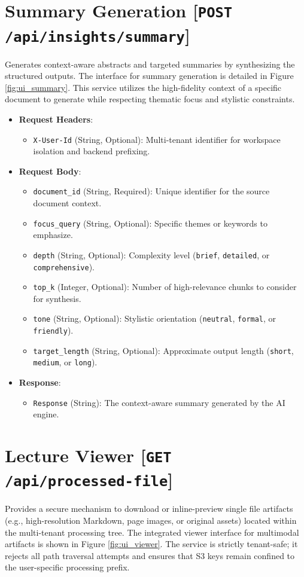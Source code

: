 \section*{Summary Generation [\texttt{POST} \texttt{/api/insights/summary}]}
Generates context-aware abstracts and targeted summaries by synthesizing the structured outputs. The interface for summary generation is detailed in Figure \ref{fig:ui_summary}. This service utilizes the high-fidelity context of a specific document to generate while respecting thematic focus and stylistic constraints.

\begin{itemize}
    \item \textbf{Request Headers}:
    \begin{itemize}
        \item \texttt{X-User-Id} (String, Optional): Multi-tenant identifier for workspace isolation and backend prefixing.
    \end{itemize}
    \item \textbf{Request Body}:
    \begin{itemize}
        \item \texttt{document\_id} (String, Required): Unique identifier for the source document context.
        \item \texttt{focus\_query} (String, Optional): Specific themes or keywords to emphasize.
        \item \texttt{depth} (String, Optional): Complexity level (\texttt{brief}, \texttt{detailed}, or \texttt{comprehensive}).
        \item \texttt{top\_k} (Integer, Optional): Number of high-relevance chunks to consider for synthesis.
        \item \texttt{tone} (String, Optional): Stylistic orientation (\texttt{neutral}, \texttt{formal}, or \texttt{friendly}).
        \item \texttt{target\_length} (String, Optional): Approximate output length (\texttt{short}, \texttt{medium}, or \texttt{long}).
    \end{itemize}
    \item \textbf{Response}:
    \begin{itemize}
        \item \texttt{Response} (String): The context-aware summary generated by the AI engine.
    \end{itemize}
\end{itemize}

\section*{Lecture Viewer [\texttt{GET} \texttt{/api/processed-file}]}
Provides a secure mechanism to download or inline-preview single file artifacts (e.g., high-resolution Markdown, page images, or original assets) located within the multi-tenant processing tree. The integrated viewer interface for multimodal artifacts is shown in Figure \ref{fig:ui_viewer}. The service is strictly tenant-safe; it rejects all path traversal attempts and ensures that S3 keys remain confined to the user-specific processing prefix.

